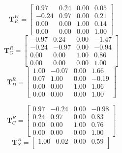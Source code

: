 \documentclass[12pt,a4paper]{article}
\newcommand{\mat}[1]{\mathbf{#1}}
\begin{document}
\noindent
\begin{tcolorbox}[enhanced,attach boxed title to top center={yshift=-3mm,yshifttext=-1mm}, colback=blue!5!white, colframe=blue!75!black, colbacktitle=blue!40!white, title=Homogeneous transforms for Random Pose 2,fonttitle=\bfseries, boxed title style={size=small,colframe=blue!50!black} ]
    \label{tab:q4_2}
    \begin{minipage}[t]{0.49\linewidth}
    \small
    \[
    \mat{T}^{W}_{R} =
    \begin{bmatrix}
     0.97 & 0.24 & 0.00 & 0.05 \\
     -0.24 & 0.97 & 0.00 & 0.21 \\
     0.00 &  0.00 & 1.00 & 0.14 \\
     0.00 &  0.00 & 0.00 & 1.00
    \end{bmatrix}
    \]
    \vspace{8pt}
    \[
    \mat{T}^{R}_{G} =
    \begin{bmatrix}
     -0.97 &  0.24 & 0.00 & -1.47 \\
     -0.24 & -0.97 & 0.00 & -0.94 \\
      0.00 &  0.00 & 1.00 &  0.86 \\
      0.00 &  0.00 & 0.00 &  1.00
    \end{bmatrix}
    \]
    \vspace{8pt}
    \[
    \mat{T}^{R}_{D} =
    \begin{bmatrix}
     1.00 & -0.07 & 0.00 &  1.66 \\
     0.07 &  1.00 & 0.00 & -0.19 \\
     0.00 &  0.00 & 1.00 &  1.06 \\
     0.00 &  0.00 & 0.00 &  1.00
    \end{bmatrix}
    \]
    \end{minipage}\hfill
    \begin{minipage}[t]{0.49\linewidth}
    \small
    \[
    \mat{T}^{R}_{C} =
    \begin{bmatrix}
     0.97 & -0.24 & 0.00 & -0.98 \\
     0.24 &  0.97 & 0.00 &  0.83 \\
     0.00 &  0.00 & 1.00 &  0.76 \\
     0.00 &  0.00 & 0.00 &  1.00
    \end{bmatrix}
    \]
    \vspace{8pt}
    \[
    \mat{T}^{R}_{S} =
    \begin{bmatrix}
      1.00 &  0.02 & 0.00 &  0.59 \\

\end{bmatrix}\]
\end{minipage}
\end{tcolorbox}
\end{document}
